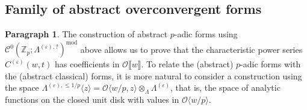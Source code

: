\documentclass[12pt]{amsart}
\theoremstyle{definition}
\newtheorem{para}[subsection]{Paragraph}
\numberwithin{equation}{subsection}
\def\calC{\mathcal{C}}
\def\calO{\mathcal{O}}
\def\calW{\mathcal{W}}
\def\CC{\mathbb{C}}
\def\ZZ{\mathbb{Z}}
\def\rmS{\mathrm{S}}
\begin{document}







\subsection{Family of abstract overconvergent forms}
\label{S:family of overconvergent forms}
\begin{para}
\label{P:para_089}
The construction of abstract $p$-adic forms using $\calC^0(\ZZ_p; \Lambda^{(\varepsilon), ?})^\mathrm{mod}$ above allows us to prove that the characteristic power series $C^{(\varepsilon)}(w,t)$ has coefficients in $\calO\llbracket w\rrbracket$. To relate the (abstract) $p$-adic forms with the (abstract classical) forms, it is more natural to consider a construction using the space $\Lambda^{(\varepsilon),\leq 1/p}\langle z\rangle = \calO\langle w/p, z\rangle \otimes_{\Lambda} \Lambda^{(\varepsilon)}$, that is, the space of analytic functions on the closed unit disk with values in $\calO\langle w/p\rangle$.
\end{para}
\end{document}

